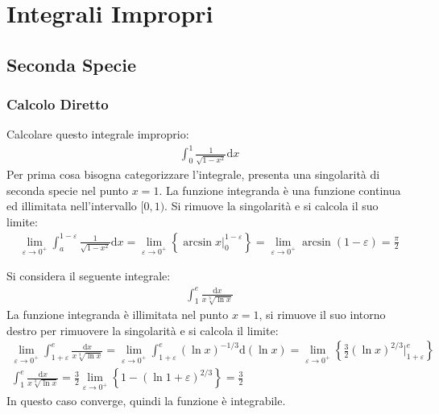 \documentclass{article}
\numberwithin{equation}{subsection}
\begin{document}
\clearpage

\section{Integrali Impropri}

\subsection{Seconda Specie}

\subsubsection{Calcolo Diretto}

Calcolare questo integrale improprio:
\begin{gather*}
    \displaystyle\int_0^1\frac{1}{\sqrt{1-x^2}}\mathrm{d}x
\end{gather*}
Per prima cosa bisogna categorizzare l'integrale, presenta una singolarità di seconda specie nel punto $x=1$. La funzione integranda è una funzione continua ed illimitata nell'intervallo $[0,1)$. 
Si rimuove la singolarità e si calcola il suo limite:
\begin{gather*}
    \lim_{\varepsilon\to0^+}\displaystyle\int_a^{1-\varepsilon}\frac{1}{\sqrt{1-x^2}}\mathrm{d}x=\lim_{\varepsilon\to0^+}\left\{\arcsin x\bigg|_0^{1-\varepsilon}\right\}=\lim_{\varepsilon\to0^+}\arcsin(1-\varepsilon)=\frac{\pi}{2}
\end{gather*}

Si considera il seguente integrale:
\begin{gather*}
    \displaystyle\int_1^e\frac{\mathrm{d}x}{x\sqrt[3]{\ln x}}
\end{gather*}
La funzione integranda è illimitata nel punto $x=1$, si rimuove il suo intorno destro per rimuovere la singolarità e si calcola il limite:
\begin{gather*}
    \lim_{\varepsilon\to0^+}\displaystyle\int_{1+\varepsilon}^e\frac{\mathrm{d}x}{x\sqrt[3]{\ln x}}=\lim_{\varepsilon\to0^+}\int_{1+\varepsilon}^e(\ln x)^{-1/3}\mathrm{d}\left(\ln x\right)=\lim_{\varepsilon\to0^+}\left\{\frac{3}{2}\left(\ln x\right)^{2/3}\bigg|_{1+\varepsilon}^e\right\}\\
    \displaystyle\int_1^e\frac{\mathrm{d}x}{x\sqrt[3]{\ln x}}=
    \frac{3}{2}\lim_{\varepsilon\to0^+}\left\{1-\left(\ln 1+\varepsilon\right)^{2/3}\right\}=\frac{3}{2}
\end{gather*}
In questo caso converge, quindi la funzione è integrabile. 
\end{document}
